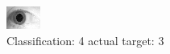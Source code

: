 \begin{figure}[h!]
\begin{center}
\includegraphics[width=0.60\columnwidth]{figures/ID1842_class_4_target_3.png}
\end{center}
\caption{ Classification: 4 actual target: 3}
\label{fig:ID1842_class_4_target_3}
\end{figure}
